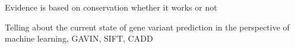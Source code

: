 Evidence is based on conservation whether it works or not

Telling about the current state of gene variant prediction in the perspective of machine learning, GAVIN, SIFT, CADD

